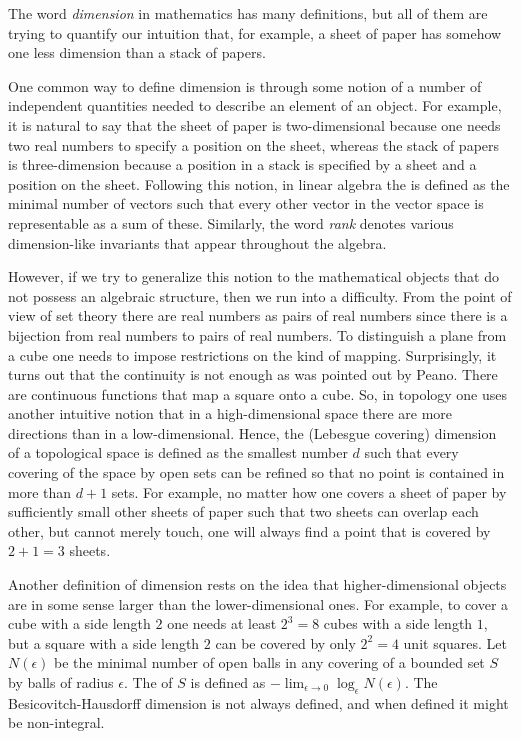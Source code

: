 \documentclass[12pt]{article}
\begin{document}
%
The word \emph{dimension} in mathematics has many definitions, but
all of them are trying to quantify our intuition that, for
example, a sheet of paper has somehow one less dimension than a
stack of papers.

One common way to define dimension is through some notion of a
number of independent quantities needed to describe an element
of an object. For example, it is natural to say that the sheet of
paper is two-dimensional because one needs two real numbers to
specify a position on the sheet, whereas the stack of papers is
three-dimension because a position in a stack is specified by a sheet
and a position on the sheet. Following this notion, in linear
algebra the  
is defined as the minimal number of vectors such that every other
vector in the vector space is representable as a sum of these.
Similarly, the word \emph{rank} denotes various dimension-like
invariants that appear throughout the algebra.

However, if we try to generalize this notion to the mathematical
objects that do not possess an algebraic structure, then we run
into a difficulty. From the point of view of set theory there are
 real numbers as pairs of real
numbers since there is a bijection from real numbers to pairs of
real numbers. To distinguish a plane from a cube one needs to
impose restrictions on the kind of mapping. Surprisingly, it turns
out that the continuity is not enough as was pointed out by Peano.
There are continuous functions that map a square onto a cube. So,
in topology one uses another intuitive notion that in a
high-dimensional space there are more directions than in a
low-dimensional. Hence, the (Lebesgue covering) dimension of a
topological space is defined as the smallest number $d$ such that
every covering of the space by open sets can be refined so that no
point is contained in more than $d+1$ sets. For example, no matter
how one covers a sheet of paper by sufficiently small other sheets
of paper such that two sheets can overlap each other, but
cannot merely touch, one will always find a point that is covered
by $2+1=3$ sheets.

Another definition of dimension rests on the idea that
higher-dimensional objects are in some sense larger than the
lower-dimensional ones. For example, to cover a cube with a side
length $2$ one needs at least $2^3=8$ cubes with a side length
$1$, but a square with a side length $2$ can be covered by only
$2^2=4$ unit squares. Let $N(\epsilon)$ be the minimal number of
open balls in any covering of a bounded set $S$ by balls of radius
$\epsilon$. The  of $S$ is defined
as $-\lim_{\epsilon\to 0} \log_\epsilon N(\epsilon)$. The
Besicovitch-Hausdorff dimension is not always defined, and when
defined it might be non-integral.
\end{document}
